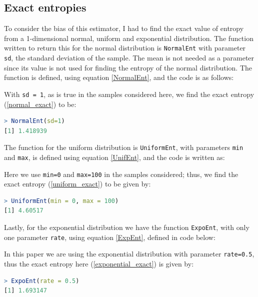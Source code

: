 \documentclass[12pt]{report}
\begin{document}
\begin{appendix}
\section{Exact entropies}

To consider the bias of this estimator, I had to find the exact value of entropy from a 1-dimensional normal, uniform and exponential distribution. The function written to return this for the normal distribution is \texttt{NormalEnt} with parameter \texttt{sd}, the standard deviation of the sample. The mean is not needed as a parameter since its value is not used for finding the entropy of the normal distribution. The function is defined, using equation \ref{NormalEnt}, and the code is as follows:



With \texttt{sd = 1}, as is true in the samples considered here, we find the exact entropy (\ref{normal_exact}) to be:

\begin{lstlisting}[language=R]
> NormalEnt(sd=1)
[1] 1.418939
\end{lstlisting}

The function for the uniform distribution is \texttt{UniformEnt}, with parameters \texttt{min} and \texttt{max}, is defined using equation \ref{UnifEnt}, and the code is written as:



Here we use \texttt{min=0} and \texttt{max=100} in the samples considered; thus, we find the exact entropy (\ref{uniform_exact}) to be given by:

\begin{lstlisting}[language=R]
> UniformEnt(min = 0, max = 100)
[1] 4.60517
\end{lstlisting}

Lastly, for the exponential distribution we have the function \texttt{ExpoEnt}, with only one parameter \texttt{rate}, using equation \ref{ExpEnt}, defined in code below:



In this paper we are using the exponential distribution with parameter \texttt{rate=0.5}, thus the exact entropy here (\ref{exponential_exact}) is given by:

\begin{lstlisting}[language=R]
> ExpoEnt(rate = 0.5)
[1] 1.693147
\end{lstlisting}




\end{appendix}
\end{document}
